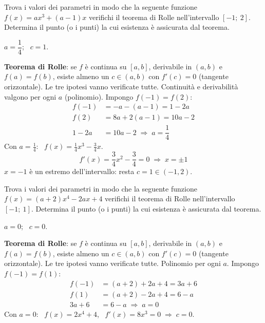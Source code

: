 \begin{question}[ID=2.1, subtitle={Parametro $a$ per Rolle: $ax^3+(a-1)x$ su $[-1,2]$}, tags={rolle, teoremi, parametrico}, difficulty=difficile]
Trova i valori dei parametri in modo che la seguente funzione $f(x) = ax^3 + (a-1)x$ verifichi il teorema di Rolle nell'intervallo $[-1;\ 2]$. Determina il punto (o i punti) la cui esistenza è assicurata dal teorema.
\begin{solution}
$a=\dfrac14$; \ $c=1$.
\end{solution}
\begin{explanation}
\textbf{Teorema di Rolle}: se $f$ è continua su $[a,b]$, derivabile in $(a,b)$ e $f(a)=f(b)$, esiste almeno un $c\in(a,b)$ con $f'(c)=0$ (tangente orizzontale). Le tre ipotesi vanno verificate tutte.
Continuità e derivabilità valgono per ogni $a$ (polinomio). Impongo $f(-1)=f(2)$:
\[\begin{aligned}
f(-1) &= -a-(a-1)=1-2a\\
f(2) &= 8a+2(a-1)=10a-2\\
1-2a &= 10a-2 \;\Rightarrow\; a=\dfrac14
\end{aligned}\]
Con $a=\tfrac14$: \ $f(x)=\tfrac14x^3-\tfrac34x$.
\[ f'(x)=\dfrac34x^2-\dfrac34=0 \;\Rightarrow\; x=\pm1 \]
$x=-1$ è un estremo dell'intervallo: resta $c=1\in(-1,2)$.
\end{explanation}
\end{question}


\begin{question}[ID=2.2, subtitle={Parametro $a$ per Rolle: $(a+2)x^4-2ax+4$ su $[-1,1]$}, tags={rolle, teoremi, parametrico}, difficulty=difficile]
Trova i valori dei parametri in modo che la seguente funzione $f(x) = (a+2)x^4 -2ax +4$ verifichi il teorema di Rolle nell'intervallo $[-1;\ 1]$. Determina il punto (o i punti) la cui esistenza è assicurata dal teorema.
\begin{solution}
$a=0$; \ $c=0$.
\end{solution}
\begin{explanation}
\textbf{Teorema di Rolle}: se $f$ è continua su $[a,b]$, derivabile in $(a,b)$ e $f(a)=f(b)$, esiste almeno un $c\in(a,b)$ con $f'(c)=0$ (tangente orizzontale). Le tre ipotesi vanno verificate tutte.
Polinomio per ogni $a$. Impongo $f(-1)=f(1)$:
\[\begin{aligned}
f(-1) &= (a+2)+2a+4=3a+6\\
f(1) &= (a+2)-2a+4=6-a\\
3a+6 &= 6-a \;\Rightarrow\; a=0
\end{aligned}\]
Con $a=0$: \ $f(x)=2x^4+4$, \ $f'(x)=8x^3=0 \;\Rightarrow\; c=0$.
\end{explanation}
\end{question}
